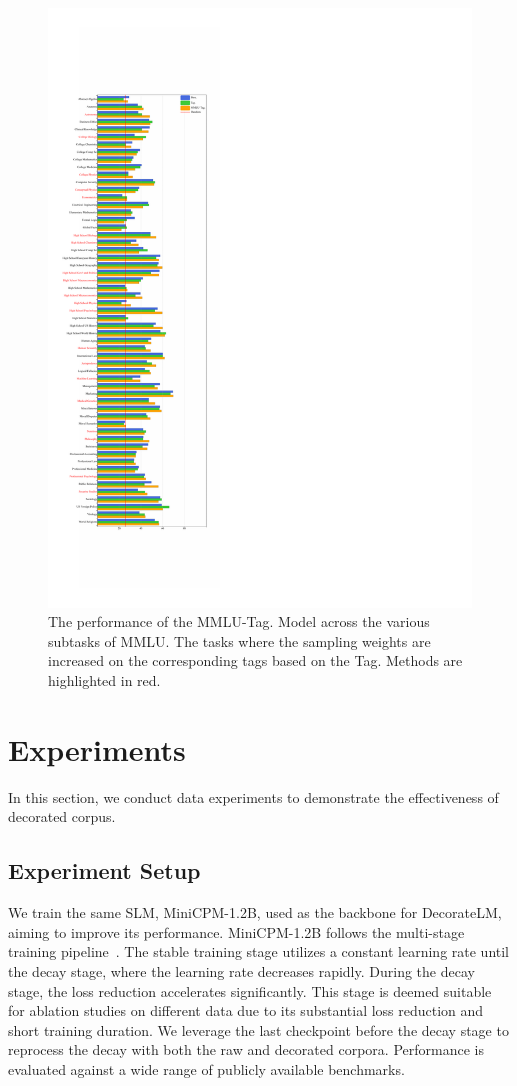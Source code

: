 \documentclass[11pt]{article}
\begin{document}
\begin{figure}[t]
    \centering
    \includegraphics[width=0.9\columnwidth]{figs/mmlu.pdf}
    \caption{The performance of the MMLU-Tag. Model across the various subtasks of MMLU. The tasks where the sampling weights are increased on the corresponding tags based on the Tag. Methods are highlighted in red.}
    \label{fig:baseline vs taggingv1 vs tagging mmlu}
\end{figure}

\section{Experiments}
In this section, we conduct data experiments to demonstrate the effectiveness of decorated corpus.
\subsection{Experiment Setup}
We train the same SLM, MiniCPM-1.2B, used as the backbone for DecorateLM, aiming to improve its performance. MiniCPM-1.2B follows the multi-stage training pipeline~\citep{hu2024minicpm}. The stable training stage utilizes a constant learning rate until the decay stage, where the learning rate decreases rapidly. During the decay stage, the loss reduction accelerates significantly. This stage is deemed suitable for ablation studies on different data due to its substantial loss reduction and short training duration. We leverage the last checkpoint before the decay stage to reprocess the decay with both the raw and decorated corpora. Performance is evaluated against a wide range of publicly available benchmarks.
\end{document}
